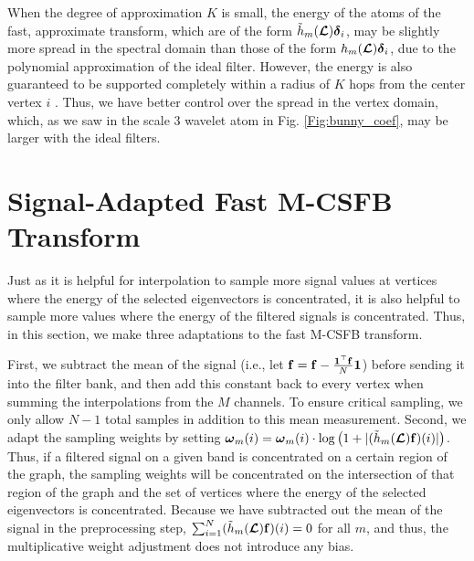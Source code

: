 \documentclass[journal, 10pt]{IEEEtran}
\begin{document}
When the degree of approximation $K$ is small, the energy of the atoms of the fast, approximate transform, which are of the form $\tilde{h}_m(\boldsymbol{\mathcal{L}}){\boldsymbol \delta}_i$, may be slightly more spread in the spectral domain than those of the form ${h}_m(\boldsymbol{\mathcal{L}}){\boldsymbol \delta}_i$, due to the polynomial approximation of the ideal filter. However, the energy is also guaranteed to be supported completely within a radius of $K$ hops from the center vertex $i$ \cite{hammond2011wavelets,shuman2015vertex}. Thus, we have better control over the spread in the vertex domain, which, as we saw in the scale 3 wavelet atom in Fig. \ref{Fig:bunny_coef}, may be larger with the ideal filters.



\section{Signal-Adapted Fast M-CSFB Transform} \label{Se:signal_adapted}
Just as it is helpful for interpolation to sample more signal values at vertices where the energy of the selected eigenvectors is concentrated, it is also helpful to sample more values where the energy of the filtered signals is concentrated. Thus, in this section, we make three adaptations to the fast M-CSFB transform. 

First, we subtract the mean of the signal (i.e., let ${\bf f}={\bf f}-\frac{{\bf 1}^{\top}{\bf f}}{N} {\bf 1}$) before sending it into the filter bank, and then add this constant back to every vertex when summing the interpolations from the $M$ channels. To ensure critical sampling, we only allow $N-1$ total samples in addition to this mean measurement. Second, we adapt the sampling weights by setting ${\boldsymbol \omega}_m(i) = {\boldsymbol \omega}_m(i) \cdot  \log\left(1+|(\tilde{h}_m(\boldsymbol{\mathcal{L}}){\bf f})(i)|\right)$. Thus, if a filtered signal on a given band is concentrated on a certain region of the graph, the sampling weights will be concentrated on the intersection of that region of the graph and the set of vertices where the energy of the selected eigenvectors is concentrated. Because we have subtracted out the mean of the signal in the preprocessing step, $\sum_{i=1}^N (\tilde{h}_m(\boldsymbol{\mathcal{L}}){\bf f})(i)=0$ for all $m$, and thus, the multiplicative weight adjustment does not introduce any bias.
\end{document}
